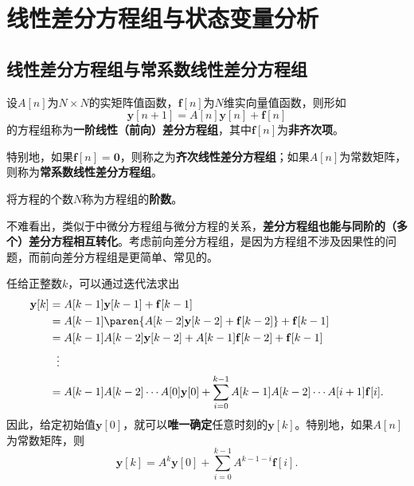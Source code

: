 \section{线性差分方程组与状态变量分析}\label{sec:Difference_Equation}

\subsection{线性差分方程组与常系数线性差分方程组}\label{sub:linear_difference_equation}

\begin{definition}[一阶线性差分方程组]
    设$A[n]$为$N\times N$的实矩阵值函数，$\mathbf{f}[n]$为$N$维实向量值函数，则形如
    \begin{equation}
        \mathbf{y}[n+1]=A[n]\mathbf{y}[n]+\mathbf{f}[n]
    \end{equation}
    的方程组称为\textbf{一阶线性（前向）差分方程组}，其中$\mathbf{f}[n]$为\textbf{非齐次项}。

    特别地，如果$\mathbf{f}[n]=\mathbf{0}$，则称之为\textbf{齐次线性差分方程组}；如果$A[n]$为常数矩阵，则称为\textbf{常系数线性差分方程组}。

    将方程的个数$N$称为方程组的\textbf{阶数}。
\end{definition}

不难看出，类似于中微分方程组与微分方程的关系，\textbf{差分方程组也能与同阶的（多个）差分方程相互转化}。考虑前向差分方程组，是因为方程组不涉及因果性的问题，而前向差分方程组是更简单、常见的。

任给正整数$k$，可以通过迭代法求出
\begin{align}
    \mathbf{y}[k]&=A[k-1]\mathbf{y}[k-1]+\mathbf{f}[k-1] \nonumber \\
    &=A[k-1]\paren{A[k-2]\mathbf{y}[k-2]+\mathbf{f}[k-2]}+\mathbf{f}[k-1] \nonumber \\
    &=A[k-1]A[k-2]\mathbf{y}[k-2]+A[k-1]\mathbf{f}[k-2]+\mathbf{f}[k-1] \nonumber \\
    &\ \ \vdots \nonumber \\
    &=A[k-1]A[k-2]\cdots A[0]\mathbf{y}[0]+\sum_{i=0}^{k-1}A[k-1]A[k-2]\cdots A[i+1]\mathbf{f}[i].
\end{align}
因此，给定初始值$\mathbf{y}[0]$，就可以\textbf{唯一确定}任意时刻的$\mathbf{y}[k]$。特别地，如果$A[n]$为常数矩阵，则
\begin{equation}
    \mathbf{y}[k]=A^k\mathbf{y}[0]+\sum_{i=0}^{k-1}A^{k-1-i}\mathbf{f}[i].
\end{equation}

